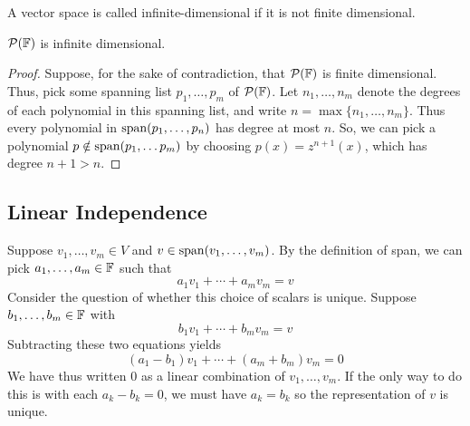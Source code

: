 \begin{definition}
    A vector space is called infinite-dimensional if it is not finite dimensional.
\end{definition}
\begin{theorem}
    $\mathcal{P}(\mathbb F)$ is infinite dimensional.
\end{theorem}
\begin{proof}
    Suppose, for the sake of contradiction, that $\mathcal{P}(\mathbb F)$ is finite dimensional. Thus, pick some spanning list $p_1, \dots, p_m$ of $\mathcal{P}(\mathbb F)$. Let $n_1, \dots, n_m$ denote the degrees of each polynomial in this spanning list, and write $n = \max\{n_1, \dots, n_m\}$. Thus every polynomial in $\operatorname{span}(p_1, \dots, p_n)$ has degree at most $n$. So, we can pick a polynomial $p\notin \operatorname{span}(p_1, \dots p_m)$ by choosing $p(x) = z^{n+1}(x)$, which has degree $n+1 > n$.
\end{proof}
\subsection*{Linear Independence}
Suppose $v_1, \dots, v_m \in V$ and $v \in \operatorname{span}(v_1, \dots, v_m)$. By the definition of span, we can pick $a_1, \dots, a_m \in \mathbb F$ such that
\[ a_1v_1 + \cdots + a_mv_m = v\]
Consider the question of whether this choice of scalars is unique. Suppose $b_1, \dots, b_m \in \mathbb F$ with
\[ b_1v_1 + \cdots + b_mv_m = v\]
Subtracting these two equations yields
\[ (a_1- b_1)v_1 + \cdots + (a_m+b_m)v_m = 0\]
We have thus written $0$ as a linear combination of $v_1, \dots, v_m$. If the only way to do this is with each $a_k-b_k = 0$, we must have $a_k=b_k$ so the representation of $v$ is unique.

